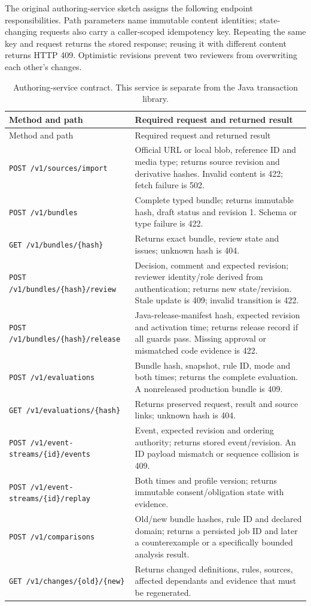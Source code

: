 \documentclass[12pt,a4paper,oneside,openany]{book}
\begin{document}
The original authoring-service sketch assigns the following endpoint responsibilities. Path parameters name
immutable content identities; state-changing requests also carry a caller-scoped
idempotency key. Repeating the same key and request returns the stored response;
reusing it with different content returns HTTP 409. Optimistic revisions prevent
two reviewers from overwriting each other's changes.
\begingroup\small
\begin{longtable}{P{0.36\textwidth}P{0.54\textwidth}}
\caption{Authoring-service contract. This service is separate from the Java
transaction library.}\\
\toprule Method and path & Required request and returned result \\\midrule
\endfirsthead
\toprule Method and path & Required request and returned result \\\midrule
\endhead
\texttt{POST /v1/sources/import} & Official URL or local blob, reference ID and media type; returns source revision and derivative hashes. Invalid content is 422; fetch failure is 502.\\
\texttt{POST /v1/bundles} & Complete typed bundle; returns immutable hash, draft status and revision 1. Schema or type failure is 422.\\
\texttt{GET /v1/bundles/\{hash\}} & Returns exact bundle, review state and issues; unknown hash is 404.\\
\texttt{POST /v1/bundles/\{hash\}/review} & Decision, comment and expected revision; reviewer identity/role derived from authentication; returns new state/revision. Stale update is 409; invalid transition is 422.\\
\texttt{POST /v1/bundles/\{hash\}/release} & Java-release-manifest hash, expected revision and activation time; returns release record if all guards pass. Missing approval or mismatched code evidence is 422.\\
\texttt{POST /v1/evaluations} & Bundle hash, snapshot, rule ID, mode and both times; returns the complete evaluation. A nonreleased production bundle is 409.\\
\texttt{GET /v1/evaluations/\{hash\}} & Returns preserved request, result and source links; unknown hash is 404.\\
\texttt{POST /v1/event-streams/\{id\}/events} & Event, expected revision and ordering authority; returns stored event/revision. An ID payload mismatch or sequence collision is 409.\\
\texttt{POST /v1/event-streams/\{id\}/replay} & Both times and profile version; returns immutable consent/obligation state with evidence.\\
\texttt{POST /v1/comparisons} & Old/new bundle hashes, rule ID and declared domain; returns a persisted job ID and later a counterexample or a specifically bounded analysis result.\\
\texttt{GET /v1/changes/\{old\}/\{new\}} & Returns changed definitions, rules, sources, affected dependants and evidence that must be regenerated.\\
\bottomrule
\end{longtable}
\endgroup
\end{document}
